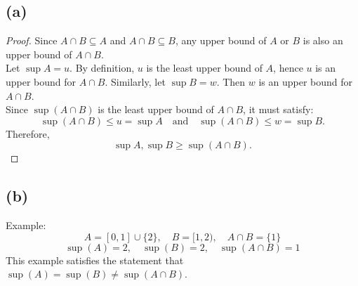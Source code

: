 \documentclass{article}
\begin{document}
\subsection*{(a)}
\begin{proof}
    Since \( A \cap B \subseteq A \) and \( A \cap B \subseteq B \), any upper bound of \( A \) or \( B \) is also an upper bound of \( A \cap B \).
    \\
    Let \( \sup A = u \). By definition, \( u \) is the least upper bound of \( A \), hence \( u \) is an upper bound for \( A \cap B \).
    Similarly, let \( \sup B = w \). Then \( w \) is an upper bound for \( A \cap B \).
    \\
    Since \( \sup(A \cap B) \) is the least upper bound of \( A \cap B \), it must satisfy:
    \[ \sup(A \cap B) \leq u = \sup A \quad \text{and} \quad \sup(A \cap B) \leq w = \sup B. \]
    Therefore,
    \[ \sup A, \sup B \geq \sup(A \cap B). \]
\end{proof}

\subsection*{(b)}
Example:
\[ A = [0, 1] \cup \{2\}, \quad B = [1, 2), \quad A \cap B = \{1\} \]
\[ \sup(A) = 2, \quad \sup(B) = 2, \quad \sup(A \cap B) = 1 \]
This example satisfies the statement that \( \sup(A) = \sup(B) \neq \sup(A \cap B) \).
\end{document}
